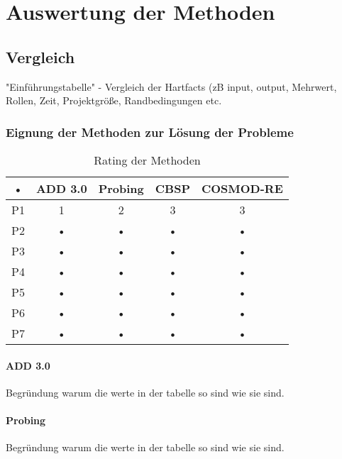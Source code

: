 \section{Auswertung der Methoden}

\subsection{Vergleich}

"Einführungstabelle" - Vergleich der Hartfacts (zB input, output, Mehrwert, Rollen, Zeit, Projektgröße, Randbedingungen etc. \\

\subsubsection{Eignung der Methoden zur Lösung der Probleme}

\begin{table}[h] %
\caption{Rating der Methoden}
\centering
\begin{tabular}{|c|c|c|c|c|}
\hline 
\rule[-1ex]{0pt}{2.5ex} • & ADD 3.0 & Probing & CBSP & COSMOD-RE \\ 
\hline 
\rule[-1ex]{0pt}{2.5ex} P1 & 1 & 2 & 3 & 3 \\ 
\hline 
\rule[-1ex]{0pt}{2.5ex}  P2 & • & • & • & • \\ 
\hline 
\rule[-1ex]{0pt}{2.5ex} P3 & • & • & • & • \\ 
\hline 
\rule[-1ex]{0pt}{2.5ex} P4 & • & • & • & • \\ 
\hline 
\rule[-1ex]{0pt}{2.5ex} P5 & • & • & • & • \\ 
\hline 
\rule[-1ex]{0pt}{2.5ex} P6 & • & • & • & • \\ 
\hline 
\rule[-1ex]{0pt}{2.5ex} P7 & • & • & • & • \\ 
\hline 
\end{tabular} 
\label{tab:eignung_der_methoden}
\end{table}


\paragraph{ADD 3.0}
Begründung warum die werte in der tabelle so sind wie sie sind. \\

\paragraph{Probing}
Begründung warum die werte in der tabelle so sind wie sie sind. \\

